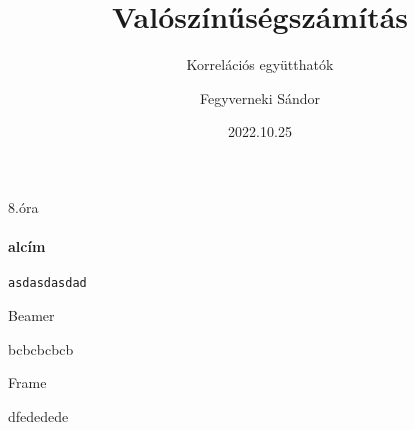 \documentclass[12pt,aspectratio=169]{beamer}
\begin{document}
\author{Fegyverneki Sándor}
\title{Valószínűségszámítás}
\subtitle{Korrelációs együtthatók}
\date{2022.10.25}

\maketitle

\begin{frame}[fragile]{8.óra}
\framesubtitle{alcím}
\begin{verbatim}
asdasdasdad
\end{verbatim}


\end{frame}
\begin{frame}[allowframebreaks]{Beamer}

bcbcbcbcb

\hulipsum

\end{frame}
\begin{frame}{Frame}

dfededede

\end{frame}
\end{document}
